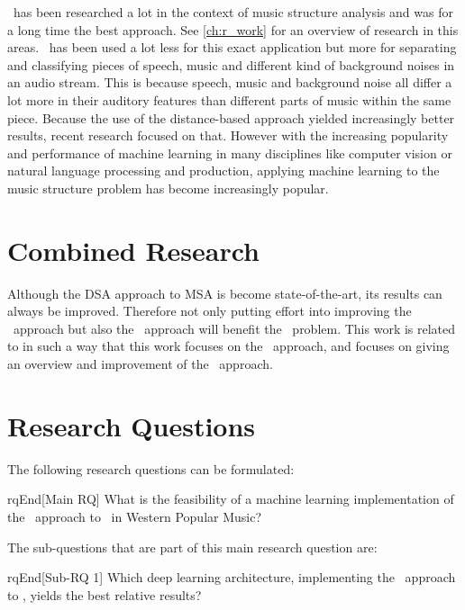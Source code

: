 \dsa\ has been researched a lot in the context of music structure analysis and was for a long time the best approach. See \autoref{ch:r_work} for an overview of research in this areas. \sba\ has been used a lot less for this exact application but more for separating and classifying pieces of speech, music and different kind of background noises in an audio stream. This is because speech, music and background noise all differ a lot more in their auditory features than different parts of music within the same piece. Because the use of the distance-based approach yielded increasingly better results, recent research focused on that. However with the increasing popularity and performance of machine learning in many disciplines like computer vision or natural language processing and production, applying machine learning to the music structure problem has become increasingly popular.


\section{Combined Research}
Although the DSA approach to MSA is become state-of-the-art, its results can always be improved. Therefore not only putting effort into improving the \sba\ approach but also the \dsa\ approach will benefit the \msa\ problem. This work is related to \textcite{Jesperthesis} in such a way that this work focuses on the \sba\ approach, and \citeauthor{Jesperthesis} focuses on giving an overview and improvement of the \dsa\ approach.


\section{Research Questions}
The following research questions can be formulated:

\begin{theoremEnd}[restate,category=rq]{rqEnd}[Main RQ]
    \label{rq:main}
    What is the feasibility of a machine learning implementation of the \sba\ approach to \msa\ in Western Popular Music?
\end{theoremEnd}

The sub-questions that are part of this main research question are:

\begin{theoremEnd}[restate,category=rq]{rqEnd}[Sub-RQ 1]
    \label{rq:sub1}
    Which deep learning architecture, implementing the \sba\ approach to \msa, yields the best relative results?
\end{theoremEnd}

